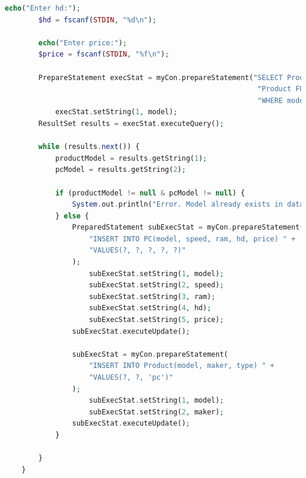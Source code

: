 \documentclass[12pt]{article}
\begin{document}
\begin{enumerate}[1.]
\begin{enumerate}[a)]
\begin{lstlisting}[language=PHP]
        echo("Enter hd:");
        $hd = fscanf(STDIN, "%d\n");

        echo("Enter price:");
        $price = fscanf(STDIN, "%f\n");

        PrepareStatement execStat = myCon.prepareStatement("SELECT Product.model AS m1, PC.model AS m2 FROM " +
                                                            "Product FULL OUTER JOIN PC" +
                                                            "WHERE model = ?");
            execStat.setString(1, model);
        ResultSet results = execStat.executeQuery();

        while (results.next()) {
            productModel = results.getString(1);
            pcModel = results.getString(2);

            if (productModel != null & pcModel != null) {
                System.out.println("Error. Model already exists in database.");
            } else {
                PreparedStatement subExecStat = myCon.prepareStatement(
                    "INSERT INTO PC(model, speed, ram, hd, price) " +
                    "VALUES(?, ?, ?, ?, ?)"
                );
                    subExecStat.setString(1, model);
                    subExecStat.setString(2, speed);
                    subExecStat.setString(3, ram);
                    subExecStat.setString(4, hd);
                    subExecStat.setString(5, price);
                subExecStat.executeUpdate();

                subExecStat = myCon.prepareStatement(
                    "INSERT INTO Product(model, maker, type) " +
                    "VALUES(?, ?, 'pc')"
                );
                    subExecStat.setString(1, model);
                    subExecStat.setString(2, maker);
                subExecStat.executeUpdate();
            }

        }
    }

    \end{lstlisting}

    \end{enumerate}

\end{enumerate}
\end{document}
